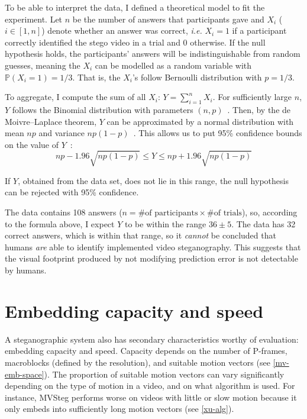 \documentclass[12pt,british,twoside,notitlepage,usenames,dvipsnames,hypens,final]{report}
\numberwithin{equation}{section}
\numberwithin{figure}{section}
\begin{document}
To be able to interpret the data, I defined a theoretical model to fit the experiment. Let $n$ be the number of answers that participants gave and $X_i$ ($i \in [1, n]$) denote whether an answer was correct, \emph{i.e.} $X_i = 1$ if a participant correctly identified the stego video in a trial and $0$ otherwise. If the null hypothesis holds, the participants' answers will be indistinguishable from random guesses, meaning the $X_i$ can be modelled as a random variable with $\mathbb{P}(X_i = 1) = 1/3$. That is, the $X_i$'s follow Bernoulli distribution with $p = 1/3$. 

To aggregate, I compute the sum of all $X_i$: $Y = \sum^n_{i=1} X_i$. For sufficiently large $n$, $Y$ follows the Binomial distribution with parameters $(n, p)$~\cite[p.~53]{papoulis2002probability}. Then, by the de Moivre--Laplace theorem, $Y$ can be approximated by a normal distribution with mean $np$ and variance $np(1-p)$~\cite[p.~105]{papoulis2002probability}. This allows us to put 95\% confidence bounds on the value of $Y$~\cite[p.~316--318]{ai2-notes}:
\[ np - 1.96 \sqrt{np(1-p)}  \leq Y \leq  np + 1.96 \sqrt{np(1-p)} \]

If $Y$, obtained from the data set, does not lie in this range, the null hypothesis can be rejected with 95\% confidence.

The data contains 108 answers ($n = \text{\# of participants} \times \text{\# of trials}$), so, according to the formula above, I expect $Y$ to be within the range $36 \pm 5$. The data has 32 correct answers, which is within that range, so it \emph{cannot} be concluded that humans \emph{are} able to identify implemented video steganography. This suggests that the visual footprint produced by not modifying prediction error is not detectable by humans.

\section{Embedding capacity and speed}

A steganographic system also has secondary characteristics worthy of evaluation: embedding capacity and speed. Capacity depends on the number of P-frames, macroblocks (defined by the resolution), and suitable motion vectors (see \ref{mv-emb-space}). The proportion of suitable motion vectors can vary significantly depending on the type of motion in a video, and on what algorithm is used. For instance, MVSteg performs worse on videos with little or slow motion because it only embeds into sufficiently long motion vectors (see \ref{xu-alg}).
\end{document}
